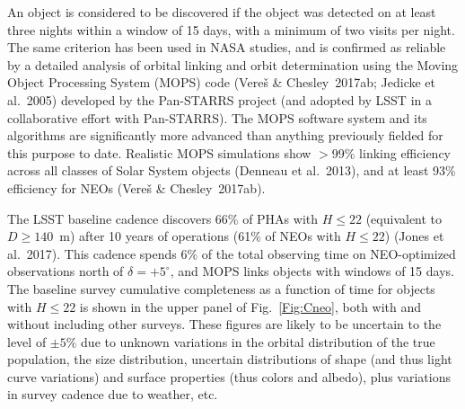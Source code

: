 An object is considered to be discovered if the object was detected on at least three nights within a
window of 15 days, with a minimum of two visits per night. The same criterion has been used in NASA studies,
and is confirmed as reliable by a detailed analysis of orbital linking and orbit determination using the Moving
Object Processing System (MOPS) code (Vere{\v s} \& Chesley~2017ab; Jedicke et al.~2005) developed by the
Pan-STARRS project (and adopted by LSST in a collaborative effort with Pan-STARRS). The MOPS software
system and its algorithms are significantly more advanced than anything previously
fielded for this purpose to date. Realistic MOPS simulations show
$>$99\% linking efficiency across all classes of Solar System objects (Denneau et al.~2013),
and at least 93\% efficiency for NEOs (Vere{\v s} \& Chesley~2017ab).

The LSST baseline cadence discovers 66\% of PHAs with $H\leq22$ (equivalent to $D\ge140$~m)
after 10 years of operations (61\% of NEOs with $H\leq22$) (Jones et al.~2017).  This cadence spends 6\% of the total
observing time on NEO-optimized observations north of $\delta = +5^\circ$, and MOPS links objects with windows of 15 days.
The baseline survey cumulative completeness as a function of time for objects with $H\le22$ is shown in the upper panel of Fig.~\ref{Fig:Cneo},
both with and without including other surveys. These figures are likely to be uncertain to the level of $\pm5\%$ due
to unknown variations in the orbital distribution of the true population, the size distribution, uncertain distributions of shape
(and thus light curve variations) and surface properties (thus colors and albedo), plus variations in survey cadence due to
weather, etc.

